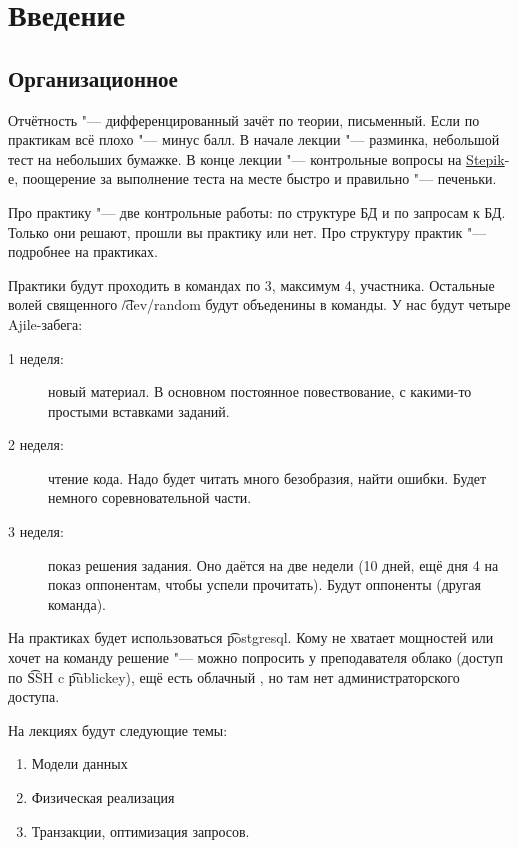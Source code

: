 \chapter{Введение}

\section{Организационное}

Отчётность "--- дифференцированный зачёт по теории, письменный.
Если по практикам всё плохо "--- минус балл.
В начале лекции "--- разминка, небольшой тест на небольших бумажке.
В конце лекции "--- контрольные вопросы на \href{http://goo.gl/ptnYrW}{Stepik}-е, поощерение за выполнение теста на месте быстро и правильно "--- печеньки.

Про практику "--- две контрольные работы: по структуре БД и по запросам к БД.
Только они решают, прошли вы практику или нет.
Про структуру практик "--- подробнее на практиках.

Практики будут проходить в командах по 3, максимум 4, участника.
Остальные волей священного \t{/dev/random} будут объеденины в команды.
У нас будут четыре Ajile-забега:
\begin{description}
\item[1 неделя:] новый материал.
	В основном постоянное повествование, с какими-то простыми вставками заданий.

\item[2 неделя:] чтение кода.
	Надо будет читать много безобразия, найти ошибки. Будет немного соревновательной части.

\item[3 неделя:] показ решения задания.
	Оно даётся на две недели (10 дней, ещё дня 4 на показ оппонентам, чтобы успели прочитать). Будут оппоненты (другая команда).
\end{description}

На практиках будет использоваться \t{postgresql}.
Кому не хватает мощностей или хочет на команду решение "--- можно попросить у преподавателя облако (доступ по \t{SSH} c \t{publickey}),
ещё есть облачный , но там нет администраторского доступа.

На лекциях будут следующие темы:
\begin{enumerate}
	\item Модели данных
	\item Физическая реализация
	\item Транзакции, оптимизация запросов.
\end{enumerate}

